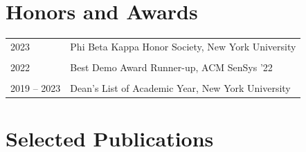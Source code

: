 \documentclass{article}
\begin{document}
\section*{Honors and Awards}
\noindent
\begin{tabular}{@{}p{1in}p{5in}} %
2023         & Phi Beta Kappa Honor Society, New York University \\
             \\
2022         & Best Demo Award Runner-up, ACM SenSys '22 \\
             \\
2019 -- 2023 & Dean's List of Academic Year, New York University \\
\end{tabular}

\section*{Selected Publications}
\nocite{*} %
\printbibliography[heading=none] %
\end{document}
